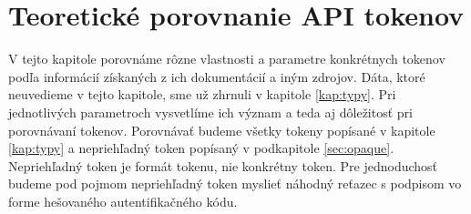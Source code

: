 \chapter{Teoretické porovnanie API tokenov}

\label{kap:teoreticke} %

V tejto kapitole porovnáme rôzne vlastnosti a parametre konkrétnych tokenov podľa informácií získaných z ich dokumentácií a iným zdrojov. Dáta, ktoré neuvedieme v tejto kapitole, sme už zhrnuli v kapitole \ref{kap:typy}. Pri jednotlivých parametroch vysvetlíme ich význam a teda aj dôležitosť pri porovnávaní tokenov. Porovnávať budeme všetky tokeny popísané v kapitole \ref{kap:typy} a nepriehľadný token popísaný v podkapitole \ref{sec:opaque}. Nepriehľadný token je formát tokenu, nie konkrétny token. Pre jednoduchosť budeme pod pojmom nepriehľadný token myslieť náhodný reťazec s podpisom vo forme hešovaného autentifikačného kódu. 

